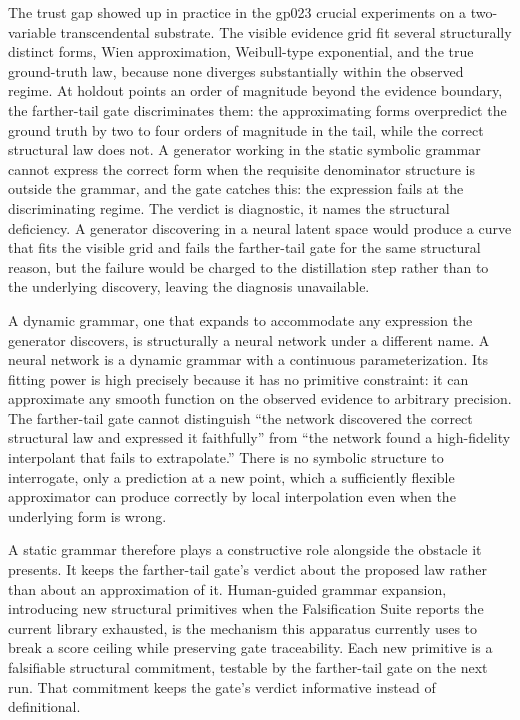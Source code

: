\documentclass[
  11pt,
]{article}
\begin{document}
The trust gap showed up in practice in the gp023 crucial
experiments on a two-variable transcendental substrate. The visible
evidence grid fit several structurally distinct forms, Wien approximation, Weibull-type exponential, and the true ground-truth
law, because none diverges substantially within the
observed regime. At holdout points an order of magnitude beyond the
evidence boundary, the farther-tail gate discriminates them: the
approximating forms overpredict the ground truth by two to four orders
of magnitude in the tail, while the correct structural law does not. A
generator working in the static symbolic grammar cannot express the
correct form when the requisite denominator structure is outside the
grammar, and the gate catches this: the expression fails at
the discriminating regime. The verdict is diagnostic, it names
the structural deficiency. A generator discovering in a neural latent
space would produce a curve that fits the visible grid and fails the
farther-tail gate for the same structural reason, but the failure would
be charged to the distillation step rather than to the underlying
discovery, leaving the diagnosis unavailable.

A dynamic grammar, one that expands to
accommodate any expression the generator discovers, is structurally
a neural network under a different name. A neural network
is a dynamic grammar with a continuous parameterization. Its fitting
power is high precisely because it has no primitive constraint: it can
approximate any smooth function on the observed evidence to arbitrary
precision. The farther-tail gate cannot distinguish ``the network
discovered the correct structural law and expressed it faithfully'' from
``the network found a high-fidelity interpolant that fails to
extrapolate.'' There is no symbolic structure to interrogate, only
a prediction at a new point, which a sufficiently flexible
approximator can produce correctly by local interpolation even when the
underlying form is wrong.

A static grammar therefore plays a constructive role alongside the
obstacle it presents. It keeps the farther-tail
gate's verdict about the proposed law rather than about an
approximation of it. Human-guided grammar expansion, introducing new structural primitives when the
Falsification Suite reports the current library exhausted, is the
mechanism this apparatus currently uses to break a score ceiling while
preserving gate traceability. Each new primitive is a falsifiable
structural commitment, testable by the farther-tail gate on the next run.
That commitment keeps the gate's verdict informative instead of
definitional.
\end{document}
